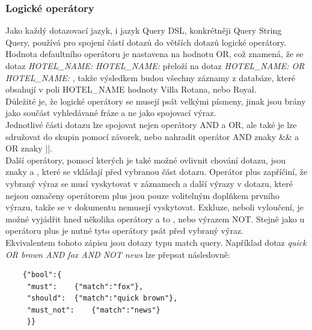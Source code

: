 \documentclass[czech,BP]{thesiskiv}
\begin{document}
\subsubsection{Logické operátory}
Jako každý dotazovací jazyk, i jazyk Query DSL, konkrétněji Query String Query, používá pro spojení částí dotazů do větších dotazů logické operátory. Hodnota defaultního operátoru je nastavena na hodnotu OR, což znamená, že se dotaz\textit{ HOTEL\_NAME:  HOTEL\_NAME:  } přeloží na dotaz \textit{HOTEL\_NAME:  OR HOTEL\_NAME:  }, takže výsledkem budou všechny záznamy z databáze, které obsahují v poli HOTEL\_NAME hodnoty Villa Rotana, nebo Royal.
\\
Důležité je, že logické operátory se musejí psát velkými písmeny, jinak jsou brány jako součást vyhledávané fráze a ne jako spojovací výraz.
\\
Jednotlivé části dotazu lze spojovat nejen operátory AND a OR, ale také je lze sdružovat do skupin pomocí závorek, nebo nahradit operátor AND znaky \&\& a OR znaky ||.
\\
Další operátory, pomocí kterých je také možné ovlivnit chování dotazu, jsou znaky \uv{+} a \uv{-}, které se vkládají před vybranou část dotazu. Operátor plus zapříčiní, že vybraný výraz se musí vyskytovat v záznamech a další výrazy v dotazu, které nejsou označeny operátorem plus jsou pouze volitelným doplňkem prvního výrazu, takže se v dokumentu nemusejí vyskytovat. Exkluze, neboli vyloučení, je možné vyjádřit hned několika operátory a to \uv{-}, \uv{!} nebo výrazem NOT. Stejně jako u operátoru plus je nutné tyto operátory psát před vybraný výraz.
\\
Ekvivalentem tohoto zápisu jsou dotazy typu match query. Například dotaz \textit{quick OR brown AND fox AND NOT news} lze přepsat následovně:
			

	\begin{lstlisting}
	{"bool":{
	 "must":	{"match":"fox"},
	 "should":	{"match":"quick brown"},
	 "must_not":	{"match":"news"}
	 }}
	\end{lstlisting}
\end{document}
